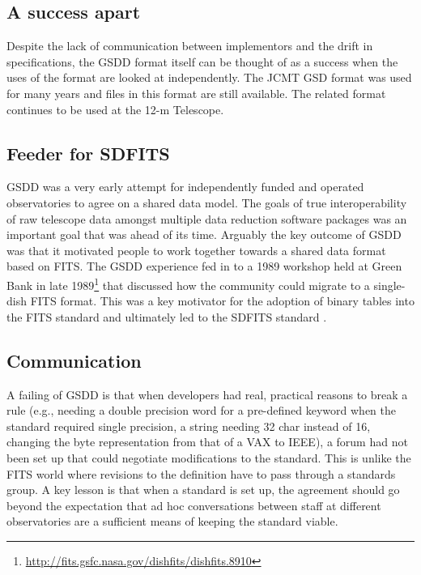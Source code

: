 \documentclass[final,authoryear,5p,times,twocolumn]{elsarticle}
\begin{document}
\subsection{A success apart}

Despite the lack of communication between implementors and the drift
in specifications, the GSDD format itself can be thought of as a
success when the uses of the format are looked at independently. The JCMT GSD
format was used for many years and files in this format are still
available. The related format continues to be used at the 12-m Telescope.


\subsection{Feeder for SDFITS}
\label{sec:sdfits}

GSDD was a very early attempt for independently funded and operated observatories to
agree on a shared data model. The goals of true interoperability of
raw telescope data amongst multiple data reduction software packages
was an important goal that was ahead of its time. Arguably the key
outcome of GSDD was that it motivated people to work together towards
a shared data format based on FITS. The GSDD experience fed in to a
1989 workshop held at Green Bank in late
1989\footnote{\url{http://fits.gsfc.nasa.gov/dishfits/dishfits.8910}}
that discussed how the community could migrate to a
single-dish FITS format. This was a key motivator for the adoption
of binary tables into the FITS standard \citep{1995A&AS..113..159C}
and ultimately led to the SDFITS standard \citep{2000ASPC..216..243G}.

\subsection{Communication}

A failing of GSDD is that when developers had real, practical reasons
to break a rule (e.g., needing a double precision word for a
pre-defined keyword when the standard required single precision, a
string needing 32 char instead of 16, changing the byte representation
from that of a VAX to IEEE), a forum had not been set up that could
negotiate modifications to the standard.  This is unlike the FITS
world where revisions to the definition have to pass through a
standards group.  A key lesson is that when a standard is
set up, the agreement should go beyond the expectation that ad hoc
conversations between staff at different observatories are a
sufficient means of keeping the standard viable.
\end{document}
